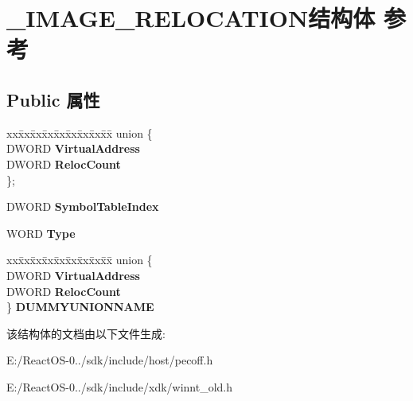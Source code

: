\hypertarget{struct___i_m_a_g_e___r_e_l_o_c_a_t_i_o_n}{}\section{\+\_\+\+I\+M\+A\+G\+E\+\_\+\+R\+E\+L\+O\+C\+A\+T\+I\+O\+N结构体 参考}
\label{struct___i_m_a_g_e___r_e_l_o_c_a_t_i_o_n}
\subsection*{Public 属性}
\begin{DoxyCompactItemize}
\item 
\mbox{\label{struct___i_m_a_g_e___r_e_l_o_c_a_t_i_o_n_aa901da5031fe6bedca68b49b28e487a8}} 
\begin{tabbing}
xx\=xx\=xx\=xx\=xx\=xx\=xx\=xx\=xx\=\kill
union \{\\
\>DWORD {\bfseries VirtualAddress}\\
\>DWORD {\bfseries RelocCount}\\
\}; \\

\end{tabbing}\item 
\mbox{\label{struct___i_m_a_g_e___r_e_l_o_c_a_t_i_o_n_af764405cedf217b7b44303b009388ecd}} 
D\+W\+O\+RD {\bfseries Symbol\+Table\+Index}
\item 
\mbox{\label{struct___i_m_a_g_e___r_e_l_o_c_a_t_i_o_n_a6408cf06d18b310d0453e4f367265446}} 
W\+O\+RD {\bfseries Type}
\item 
\mbox{\label{struct___i_m_a_g_e___r_e_l_o_c_a_t_i_o_n_a027d1e90c0626a7481fdf3f08cb60705}} 
\begin{tabbing}
xx\=xx\=xx\=xx\=xx\=xx\=xx\=xx\=xx\=\kill
union \{\\
\>DWORD {\bfseries VirtualAddress}\\
\>DWORD {\bfseries RelocCount}\\
\} {\bfseries DUMMYUNIONNAME}\\

\end{tabbing}\end{DoxyCompactItemize}


该结构体的文档由以下文件生成\+:\begin{DoxyCompactItemize}
\item 
E\+:/\+React\+O\+S-\/0../sdk/include/host/pecoff.\+h\item 
E\+:/\+React\+O\+S-\/0../sdk/include/xdk/winnt\+\_\+old.\+h\end{DoxyCompactItemize}
